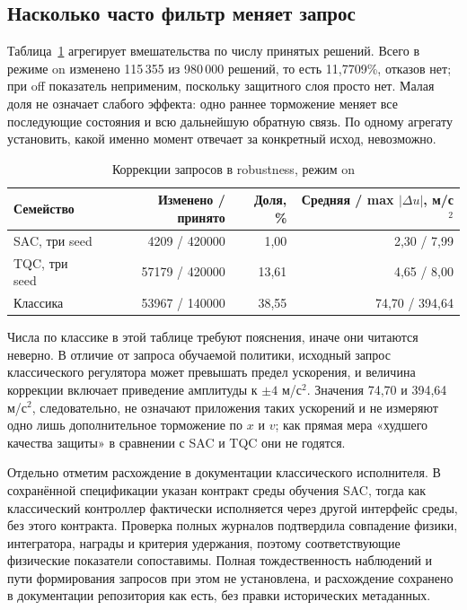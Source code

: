 \subsection{Насколько часто фильтр меняет запрос}
Таблица~\ref{tab:interventions} агрегирует вмешательства по числу принятых решений. Всего в режиме on изменено 115\,355 из 980\,000 решений, то есть 11,7709\%, отказов нет; при off показатель неприменим, поскольку защитного слоя просто нет. Малая доля не означает слабого эффекта: одно раннее торможение меняет все последующие состояния и всю дальнейшую обратную связь. По одному агрегату установить, какой именно момент отвечает за конкретный исход, невозможно.
\begin{table}[htbp]\caption{Коррекции запросов в robustness, режим on}\label{tab:interventions}
\begin{smalltable}\begin{tabularx}{\linewidth}{@{}Xrrr@{}}\toprule
Семейство & Изменено / принято & Доля, \% & Средняя / max $|\Delta u|$, м/с$^2$\\\midrule
SAC, три seed & 4209 / 420000 & 1,00 & 2,30 / 7,99\\
TQC, три seed & 57179 / 420000 & 13,61 & 4,65 / 8,00\\
Классика & 53967 / 140000 & 38,55 & 74,70 / 394,64\\\bottomrule
\end{tabularx}\end{smalltable}
\end{table}

Числа по классике в этой таблице требуют пояснения, иначе они читаются неверно. В отличие от запроса обучаемой политики, исходный запрос классического регулятора может превышать предел ускорения, и величина коррекции включает приведение амплитуды к $\pm4$ м/с$^2$. Значения 74,70 и 394,64 м/с$^2$, следовательно, не означают приложения таких ускорений и не измеряют одно лишь дополнительное торможение по $x$ и $v$; как прямая мера «худшего качества защиты» в сравнении с SAC и TQC они не годятся.

Отдельно отметим расхождение в документации классического исполнителя. В сохранённой спецификации указан контракт среды обучения SAC, тогда как классический контроллер фактически исполняется через другой интерфейс среды, без этого контракта. Проверка полных журналов подтвердила совпадение физики, интегратора, награды и критерия удержания, поэтому соответствующие физические показатели сопоставимы. Полная тождественность наблюдений и пути формирования запросов при этом не установлена, и расхождение сохранено в документации репозитория как есть, без правки исторических метаданных.

